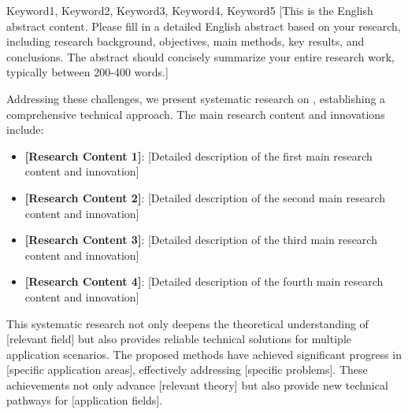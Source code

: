   \begin{englishabstract}{Keyword1, Keyword2, Keyword3, Keyword4, Keyword5}
    [This is the English abstract content. Please fill in a detailed English abstract based on your research, including research background, objectives, main methods, key results, and conclusions. The abstract should concisely summarize your entire research work, typically between 200-400 words.]

Addressing these challenges, we present systematic research on {}, establishing a comprehensive technical approach. The main research content and innovations include:

\begin{itemize}
\setlength{\itemsep}{0pt}
\item {\bfseries [Research Content 1]}: [Detailed description of the first main research content and innovation]

\item {\bfseries [Research Content 2]}: [Detailed description of the second main research content and innovation]

\item {\bfseries [Research Content 3]}: [Detailed description of the third main research content and innovation]

\item {\bfseries [Research Content 4]}: [Detailed description of the fourth main research content and innovation]
\end{itemize}

This systematic research not only deepens the theoretical understanding of [relevant field] but also provides reliable technical solutions for multiple application scenarios. The proposed methods have achieved significant progress in [specific application areas], effectively addressing [specific problems]. These achievements not only advance [relevant theory] but also provide new technical pathways for [application fields].
  
\end{englishabstract}